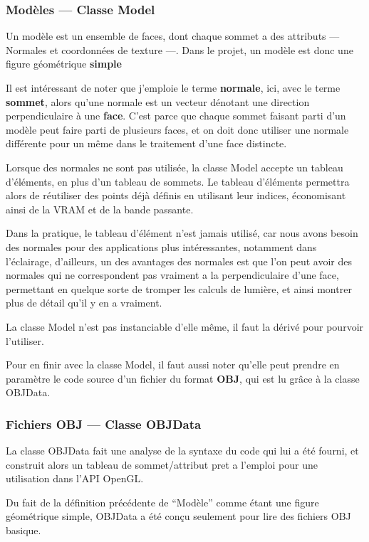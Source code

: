 \documentclass[11pt, a4paper, titlepage]{article}
\begin{document}
\subsubsection{Modèles --- Classe Model}

Un modèle est un ensemble de faces, dont chaque sommet a des attributs --- Normales et coordonnées de texture ---.
Dans le projet, un modèle est donc une figure géométrique \textbf{simple}

Il est intéressant de noter que j'emploie le terme \textbf{normale}, ici, avec le terme \textbf{sommet}, alors qu'une normale est un vecteur 
dénotant une direction perpendiculaire à une \textbf{face}. C'est parce que chaque sommet faisant parti d'un modèle peut faire parti de 
plusieurs faces, et on doit donc utiliser une normale différente pour un même dans le traitement d'une face distincte.

Lorsque des normales ne sont pas utilisée, la classe Model accepte un tableau d'éléments, en plus d'un tableau de sommets. Le tableau d'éléments permettra
alors de réutiliser des points déjà définis en utilisant leur indices, économisant ainsi de la VRAM et de la bande passante.

Dans la pratique, le tableau d'élément n'est jamais utilisé, car nous avons besoin des normales pour des applications plus intéressantes, notamment dans 
l'éclairage, d'ailleurs, un des avantages des normales est que l'on peut avoir des normales qui ne correspondent pas vraiment a la perpendiculaire d'une face,
permettant en quelque sorte de tromper les calculs de lumière, et ainsi montrer plus de détail qu'il y en a vraiment.

La classe Model n'est pas instanciable d'elle même, il faut la dérivé pour pourvoir l'utiliser.

Pour en finir avec la classe Model, il faut aussi noter qu'elle peut prendre en paramètre le code source d'un fichier du format \textbf{OBJ}, qui est 
lu grâce à la classe OBJData.

\pagebreak
\subsubsection{Fichiers OBJ --- Classe OBJData}

La classe OBJData fait une analyse de la syntaxe du code qui lui a été fourni, et construit alors un tableau de sommet/attribut pret a l'emploi pour une
utilisation dans l'API OpenGL.

Du fait de la définition précédente de ``Modèle'' comme étant une figure géométrique simple, OBJData a été conçu seulement pour lire des fichiers OBJ basique.
\end{document}
